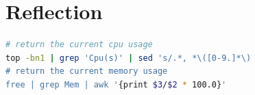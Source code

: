 \documentclass[11pt]{article}
\begin{document}
\section{Reflection}




\newpage
\appendix

\begin{lstlisting}[language=bash, label={lst:cpumem}, caption={Extract from the Python script used to determine which of the computers on the university network are suitable for rendering on. By capturing the output of the following commands I was able to get the current CPU and memory usage.}]
# return the current cpu usage
top -bn1 | grep 'Cpu(s)' | sed 's/.*, *\([0-9.]*\)
# return the current memory usage
free | grep Mem | awk '{print $3/$2 * 100.0}'
\end{lstlisting}
\end{document}
